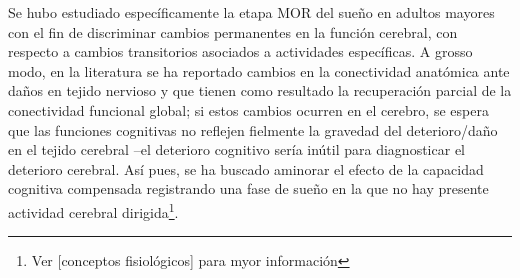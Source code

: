 Se hubo estudiado espec\'ificamente la etapa MOR del sue\~no en adultos mayores
con el fin de discriminar
cambios permanentes en la funci\'on cerebral, con respecto a cambios transitorios asociados
a actividades espec\'ificas.
A grosso modo, en la literatura se ha reportado cambios en la conectividad anat\'omica
ante da\~nos en tejido nervioso y que tienen como resultado la recuperaci\'on parcial
de la conectividad funcional global; si estos cambios ocurren en el cerebro, se espera que las
funciones cognitivas no reflejen fielmente la gravedad del deterioro/da\~no en el tejido cerebral
--el deterioro cognitivo ser\'ia in\'util para diagnosticar el deterioro cerebral.
As\'i pues, se ha buscado aminorar el efecto de la capacidad cognitiva compensada
registrando una fase de sue\~no en la que no hay presente actividad cerebral 
dirigida\footnote{Ver [conceptos fisiol\'ogicos] para myor informaci\'on}.

